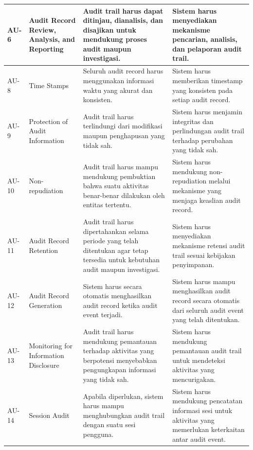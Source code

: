 \begin{xltabular}{\textwidth}{|p{1.8cm}|p{3.5cm}|X|X|}
AU-6 &
Audit Record Review, Analysis, and Reporting &
Audit trail harus dapat ditinjau, dianalisis, dan disajikan untuk mendukung proses audit maupun investigasi. &
Sistem harus menyediakan mekanisme pencarian, analisis, dan pelaporan audit trail.\\
\hline

AU-8 &
Time Stamps &
Seluruh audit record harus menggunakan informasi waktu yang akurat dan konsisten. &
Sistem harus memberikan timestamp yang konsisten pada setiap audit record.\\
\hline

AU-9 &
Protection of Audit Information &
Audit trail harus terlindungi dari modifikasi maupun penghapusan yang tidak sah. &
Sistem harus menjamin integritas dan perlindungan audit trail terhadap perubahan yang tidak sah.\\
\hline

AU-10 &
Non-repudiation &
Audit trail harus mampu mendukung pembuktian bahwa suatu aktivitas benar-benar dilakukan oleh entitas tertentu. &
Sistem harus mendukung non-repudiation melalui mekanisme yang menjaga keaslian audit record.\\
\hline

AU-11 &
Audit Record Retention &
Audit trail harus dipertahankan selama periode yang telah ditentukan agar tetap tersedia untuk kebutuhan audit maupun investigasi. &
Sistem harus menyediakan mekanisme retensi audit trail sesuai kebijakan penyimpanan.\\
\hline

AU-12 &
Audit Record Generation &
Sistem harus secara otomatis menghasilkan audit record ketika audit event terjadi. &
Sistem harus mampu menghasilkan audit record secara otomatis dari seluruh audit event yang telah ditentukan.\\
\hline

AU-13 &
Monitoring for Information Disclosure &
Audit trail harus mendukung pemantauan terhadap aktivitas yang berpotensi menyebabkan pengungkapan informasi yang tidak sah. &
Sistem harus mendukung pemantauan audit trail untuk mendeteksi aktivitas yang mencurigakan.\\
\hline

AU-14 &
Session Audit &
Apabila diperlukan, sistem harus mampu menghubungkan audit trail dengan suatu sesi pengguna. &
Sistem harus mendukung pencatatan informasi sesi untuk aktivitas yang memerlukan keterkaitan antar audit event.\\
\hline

\end{xltabular}


